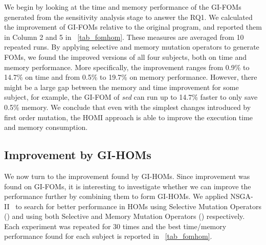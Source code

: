 \documentclass[oribibl]{llncs}
\begin{document}
We begin by looking at the time and memory performance of the GI-FOMs generated from the sensitivity analysis stage to answer the RQ1. We calculated the improvement of GI-FOMs relative to the original program, and reported them in Column 2 and 5 in \tablename~\ref{tab_fomhom}. These measures are averaged from 10 repeated runs. By applying selective and memory mutation operators to generate FOMs, we found the improved versions of all four subjects, both on time and memory performance. More specifically, the improvement ranges from 0.9\% to 14.7\% on time and from 0.5\% to 19.7\% on memory performance.  
However, there might be a large gap between the memory and time improvement for some subject, for example, the GI-FOM of \emph{sed} can run up to  14.7\%  faster to only save 0.5\% memory. We conclude that even with the simplest changes introduced by first order mutation, the HOMI approach is able to improve the execution time and memory consumption. 



\subsection{Improvement by GI-HOMs}
\label{sec_reshom}

We now turn to the improvement found by GI-HOMs. Since improvement was found on GI-FOMs, it is interesting to investigate whether we can improve the performance further by combining them to form GI-HOMs. We applied NSGA-II~\cite{996017} to search for better performance in HOMs using Selective Mutation Operators (\homss{}) and using both Selective and Memory Mutation Operators (\homsa{}) respectively. Each experiment was repeated for 30 times and the best time/memory performance found for each subject is reported in \tablename~\ref{tab_fomhom}. 
\end{document}
